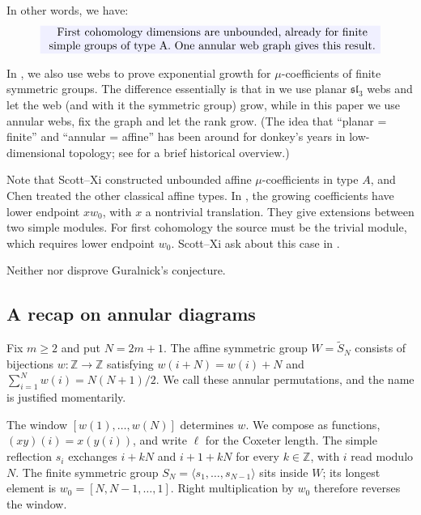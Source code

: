 \documentclass[a4paper,11pt]{amsart}
\let\emph\relax
\numberwithin{equation}{subsection}
\theoremstyle{plain}
\theoremstyle{definition}
\theoremstyle{remark}
\begin{document}
In other words, we have:
\[
\setlength{\fboxsep}{2pt}
\colorbox{blue!6}{
\begin{minipage}{0.85\textwidth}
\centering
\emph{First cohomology dimensions are unbounded, already for
finite simple
groups of type A. One annular web graph gives this result.}
\end{minipage}}
\]

\begin{remark}
In \cite{Finite}, we also use webs to
prove exponential growth for $\mu$-coefficients of finite
symmetric groups. The difference essentially is that in \cite{Finite} we use planar $\mathfrak{sl}_3$ webs and let the web (and with it the symmetric group) grow, while in this paper we use annular webs, fix the graph and let the rank grow.
(The idea that ``planar = finite'' and ``annular = affine'' has been around for donkey's years in low-dimensional topology; see \cite[Section~1B]{HT} for a brief historical overview.)

Note that Scott--Xi \cite{SX} constructed unbounded affine $\mu$-coefficients
in type $A$, and Chen \cite{Chen} treated the other classical affine
types. In \cite[Theorem~3.3]{SX}, the growing coefficients have lower endpoint $xw_0$, with $x$ a nontrivial translation. They give extensions between two simple modules. For first cohomology the source must be the trivial module, which requires lower endpoint $w_0$. Scott--Xi ask about this case in \cite[Section~4]{SX}.

Neither \cite{Finite} nor \cite{SX} disprove Guralnick's conjecture.
\end{remark}

\subsection{A recap on annular diagrams}

Fix $m\ge2$ and put $N=2m+1$. The affine symmetric group
$W=\widetilde S_N$ consists of bijections $w:\mathbb Z\to\mathbb Z$
satisfying $w(i+N)=w(i)+N$ and
$\sum_{i=1}^Nw(i)=N(N+1)/2$. We call these annular permutations, and the name is justified momentarily.

The window $[w(1),\ldots,w(N)]$ determines $w$.
We compose as functions, $(xy)(i)=x(y(i))$, and write $\ell$
for the Coxeter length. The simple reflection $s_i$ exchanges
$i+kN$ and $i+1+kN$ for every $k\in\mathbb Z$, with $i$ read
modulo $N$. The finite symmetric group
$S_N=\langle s_1,\ldots,s_{N-1}\rangle$ sits inside $W$;
its longest element is $w_0=[N,N-1,\ldots,1]$.
Right multiplication by $w_0$ therefore reverses the window.
\end{document}
